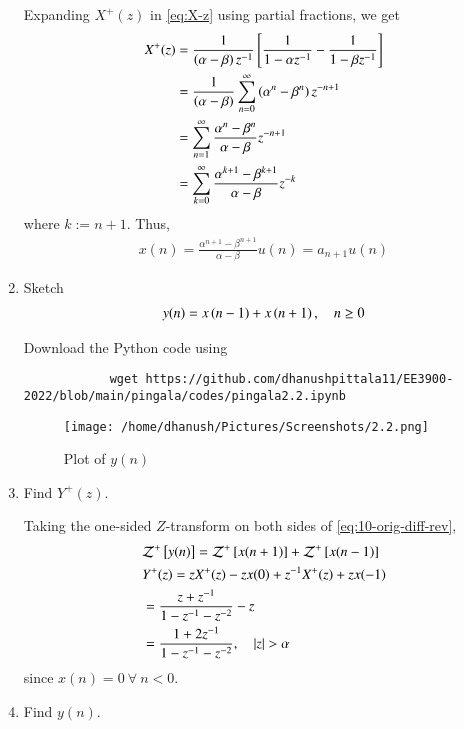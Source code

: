 \documentclass[journal,12pt,twocolumn]{IEEEtran}
\renewcommand\thesection{\arabic{section}}
\begin{document}
\begin{enumerate}[label=\thesection.\arabic*,ref=\thesection.\theenumi]
		\solution Expanding $X^+(z)$ in \eqref{eq:X-z} using partial fractions, we get
		\begin{align}
			X^+(z) &= \frac{1}{\left(\alpha - \beta\right)z^{-1}}{}\left[\frac{1}{1 - \alpha z^{-1}} - \frac{1}{1 - \beta z^{-1}}\right] \\
			&= \frac{1}{\left(\alpha - \beta\right)}\sum_{n = 0}^{\infty}\left(\alpha^n - \beta^n\right)z^{-n + 1} \\
			&= \sum_{n = 1}^{\infty}\frac{\alpha^{n} - \beta^{n}}{\alpha - \beta}z^{-n + 1} \\
			&= \sum_{k = 0}^{\infty}\frac{\alpha^{k + 1} - \beta^{k + 1}}{\alpha - \beta}z^{-k}
		\end{align}
		where $k := n + 1$. Thus,
		\begin{align}
			x(n) = \frac{\alpha^{n + 1} - \beta^{n + 1}}{\alpha - \beta}u(n) = a_{n + 1}u(n)
			\label{eq:x-n-def}
		\end{align}
		\item Sketch 
		\begin{align}
			y(n) = x\left(n-1\right) + x\left(n+1\right),  \quad n \ge 0
			\label{eq:10-orig-diff-rev}
		\end{align}
		
		\solution
		Download the Python code using
		\begin{lstlisting}
			wget https://github.com/dhanushpittala11/EE3900-2022/blob/main/pingala/codes/pingala2.2.ipynb
		\end{lstlisting}
		\begin{figure}[!htbp]
			\texttt{[image: /home/dhanush/Pictures/Screenshots/2.2.png]}
			\caption{Plot of $y(n)$}
			\label{fig:yn}
		\end{figure}
		\item Find $Y^{+}(z)$. 
		
		\solution Taking the one-sided $Z$-transform on both sides of \eqref{eq:10-orig-diff-rev},
		\begin{align}
			&\mathcal{Z}^+{}\left[y(n)\right] = \mathcal{Z}^+{}\left[x(n + 1)\right] + \mathcal{Z}^+{}\left[x(n - 1)\right] \\
			&Y^+(z) = zX^+(z) - zx(0) + z^{-1}X^+(z) + zx(-1) \\
			&= \frac{z + z^{-1}}{1 - z^{-1} - z^{-2}} - z \\
			&= \frac{1 + 2z^{-1}}{1 - z^{-1} - z^{-2}}, \quad |z| > \alpha
		\end{align}
		since $x(n) = 0\ \forall\ n < 0$.
		\item Find $y(n)$.
		\label{pr:1-3}
		

\end{enumerate}
\end{document}

